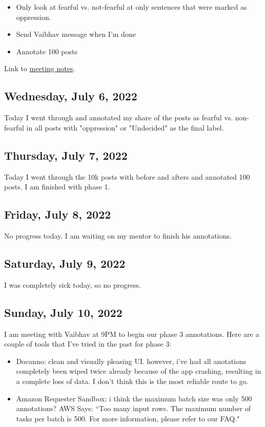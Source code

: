 \documentclass[11pt,letterpaper]{article}
\begin{document}
\begin{itemize}
    \item Only look at fearful vs. not-fearful at only sentences that were marked as oppression.
    \item Send Vaibhav message when I'm done
    \item Annotate 100 posts
\end{itemize}

Link to \href{https://docs.google.com/document/d/1eEZaqT8RIj2LU541y_P7s_mW0gKrRpY3Ivmap_tp094/edit?usp=sharing}{meeting notes}.

\subsection{Wednesday, July 6, 2022}
Today I went through and annotated my share of the posts as fearful vs. non-fearful in all posts with "oppression" or "Undecided" as the final label.

\subsection{Thursday, July 7, 2022}
Today I went through the 10k posts with before and afters and annotated 100 posts. I am finished with phase 1.

\subsection{Friday, July 8, 2022}
No progress today. I am waiting on my mentor to finish his annotations.

\subsection{Saturday, July 9, 2022}
I was completely sick today, so no progress.

\subsection{Sunday, July 10, 2022}
I am meeting with Vaibhav at 9PM to begin our phase 3 annotations. Here are a couple of tools that I've tried in the past for phase 3:

\begin{itemize}
    \item Docanno: clean and visually pleasing UI. however, i've had all anotations completely been wiped twice already because of the app crashing, resulting in a complete loss of data. I don't think this is the most reliable route to go.
    \item Amazon Requester Sandbox: i think the maximum batch size was only 500 annotations? AWS Says: ``Too many input rows. The maximum number of tasks per batch is 500. For more information, please refer to our FAQ."
\end{itemize}
\end{document}
